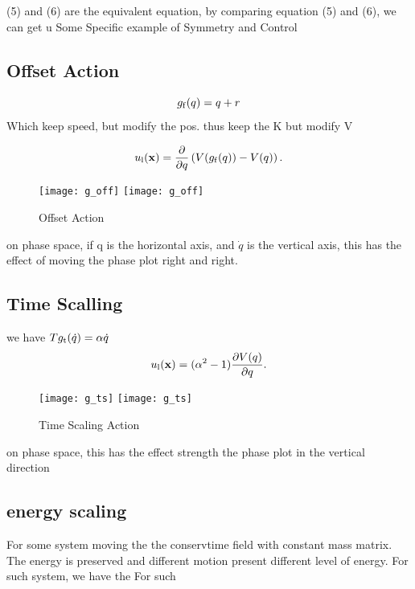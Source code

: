 (5) and (6) are the equivalent equation, by comparing  equation (5) and (6), we can get u
Some Specific example of Symmetry and Control
\subsection*{ Offset Action}
\[
g_{\mathrm{f}}(q) = q+r
\]
Which keep speed, but modify the pos. thus keep the K but modify V

\begin{equation}
u_{\mathrm{l}}(\mathbf{x}) = \frac{\partial}{\partial q} \left(V(g_{\mathrm{f}}(q)) - V(q)\right).
\end{equation}

\begin{figure}[!htbp]
  \begin{center}
    \leavevmode
    \ifpdf
      \texttt{[image: g\_off]}
    \else
      \texttt{[image: g\_off]}
    \fi
    \caption{Offset Action}
    \label{fig:goff}
\end{center}
\end{figure}
on phase space, if q is the horizontal axis, and $\dot{q}$ is the vertical axis, this has the effect of moving the phase plot right and right.
\subsection*{Time Scalling}

we have
$Tg_{\mathrm{t}}(\dot{q})=\alpha \dot{q}$
\begin{equation}
u_{\mathrm{l}}(\mathbf{x}) = (\alpha^2 - 1) \frac{\partial V(q)}{\partial q}.
\end{equation}

\begin{figure}[!htbp]
  \begin{center}
    \leavevmode
    \ifpdf
      \texttt{[image: g\_ts]}
    \else
      \texttt{[image: g\_ts]}
    \fi
    \caption{Time Scaling Action}
    \label{fig:gts}
\end{center}
\end{figure}
on phase space, this has the effect strength the phase plot in the vertical direction

\subsection*{energy scaling}
For some system moving the the conservtime field with constant mass matrix.
The energy is preserved and different motion present different level of energy.
For such system, we have the 
For such

